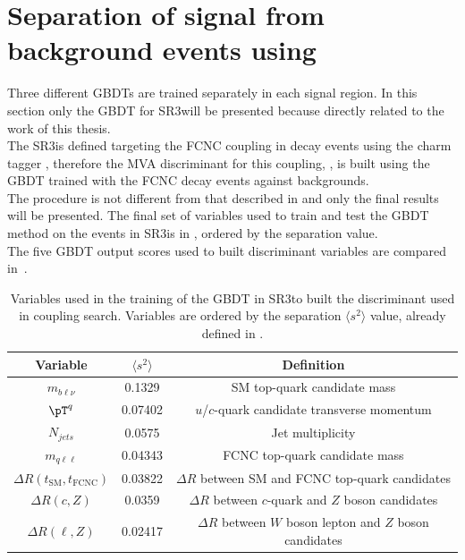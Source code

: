 \section{Separation of signal from background events using \DLrc}
\label{sec:separation_all}
Three different GBDTs are trained separately in each signal region.
In this section only the GBDT for SR3\tZc will be presented because directly related to the work of this thesis.\\
The SR3\tZc is defined targeting the FCNC \tZc coupling in \ttbar decay events using the charm tagger \DLrc, therefore the MVA discriminant for this coupling, \Dthree, is built using the GBDT trained with the FCNC \tZc \ttbar decay events against backgrounds.\\
The procedure is not different from that described in  and only the final results will be presented.
The final set of variables used to train and test the GBDT method on the events in
SR3\tZc is in , ordered by the separation value.\\
The five GBDT output scores used to built discriminant variables are compared in~.\\
\begin{table}[!htbp]
	\small
	\centering
	\begin{tabular}{ccc}
		\toprule
		Variable & $\langle s^{2}\rangle$  & Definition \\
		\midrule
		$m_{b\ell\nu}$  &  0.1329  &  SM top-quark candidate mass  \\
		$\pT^{q}$  &  0.07402  &  $u$/$c$-quark candidate transverse momentum  \\
		$N_{jets}$  &  0.0575  &  Jet multiplicity  \\
		$m_{q\ell\ell}$  &  0.04343  &  FCNC top-quark candidate mass  \\
		$\Delta R(t_{\text{SM}},t_{\text{FCNC}})$  &  0.03822  &  $\Delta R$ between SM and FCNC top-quark candidates  \\
		$\Delta R(c,Z)$  &  0.0359  &  $\Delta R$ between $c$-quark and $Z$ boson candidates  \\
		$\Delta R(\ell,Z)$  &  0.02417  &  $\Delta R$ between $W$ boson lepton and $Z$ boson candidates  \\
		\bottomrule
	\end{tabular}
	\caption{ Variables used in the training of the GBDT in SR3\tZc to built the \Dthree discriminant used in \tZc coupling search. Variables are ordered by the separation 	$\langle s^{2}\rangle$ value, already defined in . }%
\label{tab:D3input_dl1rc}
\end{table}

